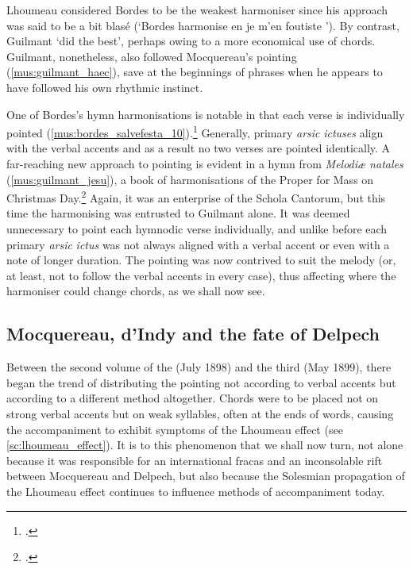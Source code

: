 Lhoumeau considered Bordes to be the weakest harmoniser since his approach was said to be a bit blasé (`Bordes harmonise en \guillemotleft{} je m'en foutiste \guillemotright{}').
By contrast, Guilmant `did the best', perhaps owing to a more economical use of chords.
Guilmant, nonetheless, also followed Mocquereau's pointing (\cref{mus:guilmant_haec}), save at the beginnings of phrases when he appears to have followed his own rhythmic instinct.
\noclub[2]

One of Bordes's hymn harmonisations is notable in that each verse is individually pointed (\cref{mus:bordes_salvefesta_10}).\footcite[4--6, 9--11]{DIndyMelodiaepaschalesChoix1898}
Generally, primary \emph{arsic} \emph{ictuses} align with the verbal accents and as a result no two verses are pointed identically.
A far-reaching new approach to pointing is evident in a hymn from \emph{Melodiæ natales} (\cref{mus:guilmant_jesu}), a book of harmonisations of the Proper for Mass on Christmas Day.\footcite[5]{GuilmantMelodiaenatalesChoix1898}
Again, it was an enterprise of the Schola Cantorum, but this time the harmonising was entrusted to Guilmant alone.
It was deemed unnecessary to point each hymnodic verse individually, and unlike before each primary \emph{arsic} \emph{ictus} was not always aligned with a verbal accent or even with a note of longer duration.
The pointing was now contrived to suit the melody (or, at least, not to follow the verbal accents in every case), thus affecting where the harmoniser could change chords, as we shall now see.


\subsection{Mocquereau, d'Indy and the fate of Delpech}
Between the second volume of the \ldo{} (July 1898) and the third (May 1899), there began the trend of distributing the pointing not according to verbal accents but \mbox{according} to a different method altogether.
Chords were to be placed not on strong verbal accents but on weak syllables, often at the ends of words, causing the accompaniment to exhibit symptoms of the Lhoumeau effect (see \cref{sc:lhoumeau_effect}).
It is to this phenomenon that we shall now turn, not alone because it was responsible for an international fracas and an inconsolable rift between Mocquereau and Delpech, but also because the Solesmian propagation of the Lhoumeau effect continues to influence methods of accompaniment today.

